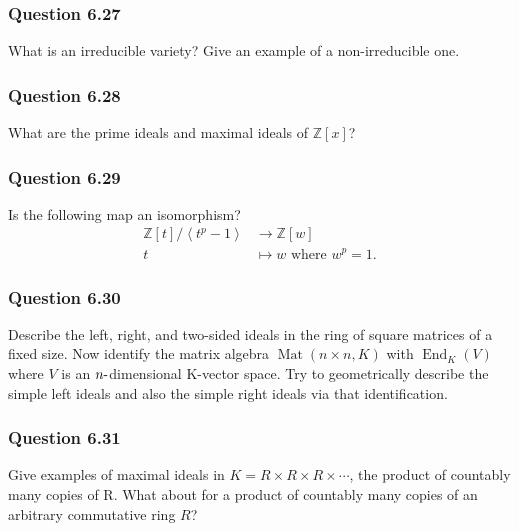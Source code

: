 \hypertarget{question-6.27}{%
\subsubsection{Question 6.27}\label{question-6.27}}

What is an irreducible variety? Give an example of a non-irreducible
one.

\hypertarget{question-6.28}{%
\subsubsection{Question 6.28}\label{question-6.28}}

What are the prime ideals and maximal ideals of \({\mathbb{Z}}[x]\)?

\hypertarget{question-6.29}{%
\subsubsection{Question 6.29}\label{question-6.29}}

Is the following map an isomorphism?
\begin{align*}
{\mathbb{Z}}[t] / \left\langle{ t^p - 1 }\right\rangle  &\to {\mathbb{Z}}[w] \\
t &\mapsto w \text{ where } w^p = 1
.\end{align*}

\hypertarget{question-6.30}{%
\subsubsection{Question 6.30}\label{question-6.30}}

Describe the left, right, and two-sided ideals in the ring of square
matrices of a fixed size. Now identify the matrix algebra
\(\operatorname{Mat}(n \times n, K)\) with
\(\mathop{\mathrm{End}}_K(V )\) where \(V\) is an
\(n{\hbox{-}}\)dimensional K-vector space. Try to geometrically describe
the simple left ideals and also the simple right ideals via that
identification.

\hypertarget{question-6.31}{%
\subsubsection{Question 6.31}\label{question-6.31}}

Give examples of maximal ideals in
\(K = R \times R \times R \times \cdots\), the product of countably many
copies of R. What about for a product of countably many copies of an
arbitrary commutative ring \(R\)?

